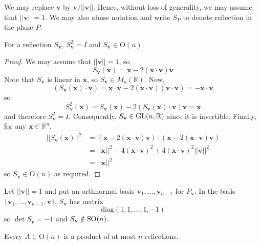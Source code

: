 \documentclass[10pt, a4paper, twoside]{report}
\begin{document}
\begin{remark}
    We may replace \(\mathbf{v}\) by \(\mathbf{v}/||\mathbf{v}||\). Hence, without loss of generality, we may assume that \(||\mathbf{v}||=1\). We may also abuse notation and write \(S_P\) to denote reflection in the plane \(P\).
\end{remark}
\begin{lemma}
    For a reflection \(S_\mathbf{v}\), \(S_\mathbf{v}^2=I\) and \(S_\mathbf{v}\in\mathrm{O}(n)\).
\end{lemma}
\begin{proof}
    We may assume that \(||\mathbf{v}||=1\), so 
    \[S_\mathbf{v}(\mathbf{x})=\mathbf{x}-2(\mathbf{x}\cdot\mathbf{v})\mathbf{v}\]
    Note that \(S_\mathbf{v}\) is linear in \(\mathbf{x}\), so \(S_\mathbf{v}\in M_n(\mathbb{R})\). Now,
    \[(S_\mathbf{v}(\mathbf{x})\cdot\mathbf{v})=\mathbf{x}\cdot\mathbf{v}-2(\mathbf{x}\cdot\mathbf{v})(\mathbf{v}\cdot\mathbf{v})=-\mathbf{x}\cdot\mathbf{v}\]
    so 
    \[S_\mathbf{v}^2(\mathbf{x})=S_\mathbf{v}(\mathbf{x})-2(S_\mathbf{v}(\mathbf{x})\cdot\mathbf{v})\mathbf{v}=\mathbf{x}\]
    and therefore \(S_\mathbf{v}^2=I\). Consequently, \(S_\mathbf{v}\in\operatorname{GL}(n,\mathbb{R})\) since it is invertible. Finally, for any \(\mathbf{x}\in\mathbb{R}^n\), 
    \begin{align*}
        ||S_\mathbf{v}(\mathbf{x})||^2&=(\mathbf{x}-2(\mathbf{x}\cdot\mathbf{v})\mathbf{v})\cdot(\mathbf{x}-2(\mathbf{x}\cdot\mathbf{v})\mathbf{v}) \\
        &=||\mathbf{x}||^2-4(\mathbf{x}\cdot\mathbf{v})^2+4(\mathbf{x}\cdot\mathbf{v})^2||\mathbf{v}||^2 \\
        &=||\mathbf{x}||^2
    \end{align*}
    so \(S_\mathbf{v}\in\mathrm{O}(n)\) as required.
\end{proof}
\begin{remark}
    Let \(||\mathbf{v}||=1\) and put an orthnormal basis \(\mathbf{v}_1,\ldots,\mathbf{v}_{n-1}\) for \(P_\mathbf{v}\). In the basis \(\{\mathbf{v}_1,\ldots,\mathbf{v}_{n-1},\mathbf{v}\}\), \(S_\mathbf{v}\) has matrix 
    \[\text{diag}(1,1,\ldots,1,-1)\]
    so \(\det S_\mathbf{v}=-1\) and \(S_\mathbf{v}\notin\operatorname{SO}(n)\).
\end{remark}
\begin{theorem}
    Every \(A\in\mathrm{O}(n)\) is a product of at most \(n\) reflections.
    \label{thm:orth_reflect}
\end{theorem}
\end{document}
